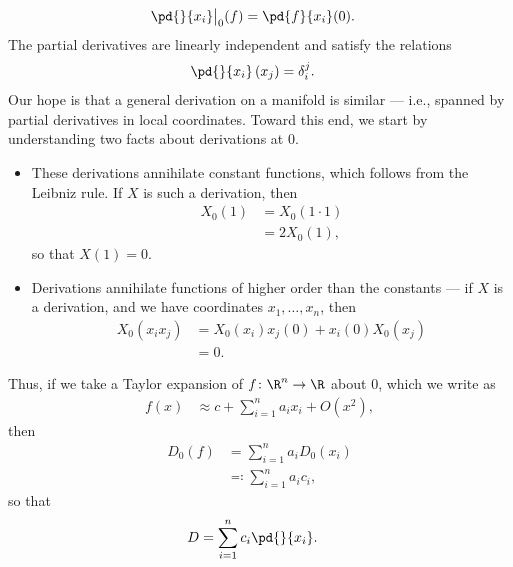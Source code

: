 \documentclass[10pt]{mypackage}
\begin{document}
\begin{align*}
  \pd{}{x_i}\bigr\vert_{0}(f) &= \pd{f}{x_i}(0).
\end{align*}
The partial derivatives are linearly independent and satisfy the relations
\begin{align*}
  \pd{}{x_i} \left( x_j \right) &= \delta_{i}^{j}.
\end{align*}
Our hope is that a general derivation on a manifold is similar --- i.e., spanned by partial derivatives in local coordinates. Toward this end, we start by understanding two facts about derivations at $0$.
\begin{itemize}
  \item These derivations annihilate constant functions, which follows from the Leibniz rule. If $X$ is such a derivation, then
    \begin{align*}
      X_0\left( 1 \right) &= X_0\left( 1\cdot 1 \right)\\
                        &= 2X_0(1),
    \end{align*}
    so that $X(1) = 0$.
  \item Derivations annihilate functions of higher order than the constants --- if $X$ is a derivation, and we have coordinates $x_1,\dots,x_n$, then
    \begin{align*}
      X_0\left( x_ix_j \right) &= X_0\left( x_i \right)x_j\left( 0 \right) + x_i(0)X_0\left( x_j \right)\\
                               &= 0.
    \end{align*}
\end{itemize}
Thus, if we take a Taylor expansion of $f\colon \R^{n}\rightarrow \R$ about $0$, which we write as
\begin{align*}
  f(x) &\approx c + \sum_{i=1}^{n}a_ix_i + O\left( x^2 \right),
\end{align*}
then
\begin{align*}
  D_0(f) &= \sum_{i=1}^{n}a_i D_0\left( x_i \right)\\
         &\eqcolon \sum_{i=1}^{n}a_ic_i,
\end{align*}
so that
\begin{align*}
  D &= \sum_{i=1}^{n}c_i \pd{}{x_i}.
\end{align*}
\end{document}
